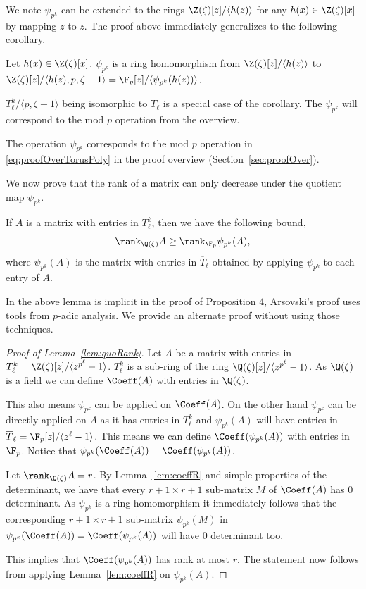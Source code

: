 We note $\psi_{p^k}$ can be extended to the rings $\Z(\zeta)[z]/\langle h(z)\rangle$ for any $h(x)\in \Z(\zeta)[x]$ by mapping $z$ to $z$. The proof above immediately generalizes to the following corollary.

\begin{cor}\label{cor:psiE}
Let $h(x)\in \Z(\zeta)[x]$. $\psi_{p^k}$ is a ring homomorphism from $\Z(\zeta)[z]/\langle h(z)\rangle$ to $\Z(\zeta)[z]/\langle h(z), p,\zeta-1\rangle=\F_p[z]/\langle \psi_{p^k}(h(z))\rangle$.
\end{cor}
$T_{\ell}^k/\langle p,\zeta-1\rangle$ being isomorphic to $\overline{T}_{\ell}$ is a special case of the corollary. The $\psi_{p^k}$ will correspond to the mod $p$ operation from the overview.

The operation $\psi_{p^k}$ corresponds to the mod $p$ operation in \eqref{eq:proofOverTorusPoly} in the proof overview (Section~\ref{sec:proofOver}).

We now prove that the rank of a matrix can only decrease under the quotient map $\psi_{p^k}$.

\begin{lem}\label{lem:quoRank}
If $A$ is a matrix with entries in $T_{\ell}^k$, then we have the following bound,
{\em$$\rank_{\Q(\zeta)} A  \ge \rank_{\F_p} \psi_{p^k}(A),$$}
where $\psi_{p^k}(A)$ is the matrix with entries in $\overline{T}_{\ell}$ obtained by applying $\psi_{p^k}$ to each entry of $A$.  
\end{lem}
In \cite{arsovski2021padic} the above lemma is implicit in the proof of Proposition 4, Arsovski's proof uses tools from $p$-adic analysis. We provide an alternate proof without using those techniques. 
\begin{proof}[Proof of Lemma~\ref{lem:quoRank}]
Let $A$ be a matrix with entries in $T_{\ell}^k=\Z(\zeta)[z]/\langle z^{p^\ell}-1\rangle$. $T^k_\ell$ is a sub-ring of the ring $\Q(\zeta)[z]/\langle z^{p^\ell}-1\rangle$. As $\Q(\zeta)$ is a field we can define $\Coeff(A)$ with entries in $\Q(\zeta)$. 

This also means $\psi_{p^k}$ can be applied on $\Coeff(A)$. On the other hand $\psi_{p^k}$ can be directly applied on $A$ as it has entries in $T_\ell^k$ and $\psi_{p^k}(A)$ will have entries in $\overline{T}_\ell = \F_p[z]/\langle z^\ell -1 \rangle$. This means we can define $\Coeff(\psi_{p^k}(A))$ with entries in $\F_p$. Notice that $\psi_{p^k}(\Coeff(A))=\Coeff(\psi_{p^k}(A))$.

Let $\rank_{\Q(\zeta)} A=r$. By Lemma~\ref{lem:coeffR} and simple properties of the determinant, we have that every $r+1\times r+1$ sub-matrix $M$ of $\Coeff(A)$ has $0$ determinant. As $\psi_{p^k}$ is a ring homomorphism it immediately follows that the corresponding $r+1\times r+1$ sub-matrix $\psi_{p^k}(M)$ in $\psi_{p^k}(\Coeff(A))=\Coeff(\psi_{p^k}(A))$ will have $0$ determinant too. 

This implies that $\Coeff(\psi_{p^k}(A))$ has rank at most $r$. The statement now follows from applying Lemma~\ref{lem:coeffR} on $\psi_{p^k}(A)$.  
\end{proof}


